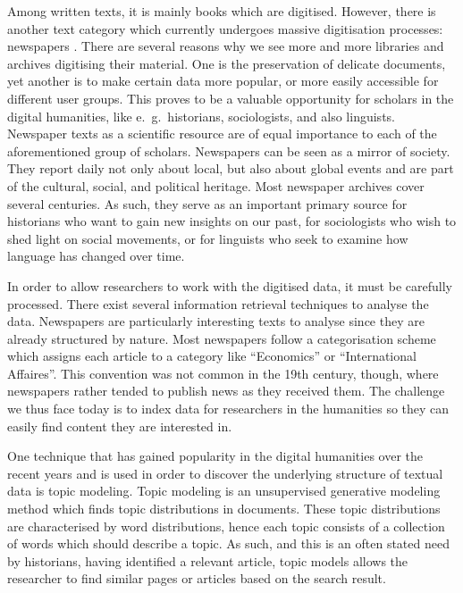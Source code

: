 Among written texts, it is mainly books which are digitised. However, there is another text category which currently undergoes massive digitisation processes: newspapers \citep{lansdall-welfarecontent2017,prestondigital2016,binghamdigitization2010}. There are several reasons why we see more and more libraries and archives digitising their material. One is the preservation of delicate documents, yet another is to make certain data more popular, or more easily accessible for different user groups. This proves to be a valuable opportunity for scholars in the digital humanities, like e.~g.~historians, sociologists, and also linguists. Newspaper texts as a scientific resource are of equal importance to each of the aforementioned group of scholars. Newspapers can be seen as a mirror of society. They report daily not only about local, but also about global events and are part of the cultural, social, and political heritage. Most newspaper archives cover several centuries. As such, they serve as an important primary source for historians who want to gain new insights on our past, for sociologists who wish to shed light on social movements, or for linguists who seek to examine how language has changed over time.

In order to allow researchers to work with the digitised data, it must be carefully processed. There exist several information retrieval techniques to analyse the data. Newspapers are particularly interesting texts to analyse since they are already structured by nature. Most newspapers follow a categorisation scheme which assigns each article to a category like ``Economics'' or ``International Affaires''. This convention was not common in the 19th century, though, where newspapers rather tended to publish news as they received them. The challenge we thus face today is to index data for researchers in the humanities so they can easily find content they are interested in. 

One technique that has gained popularity in the digital humanities over the recent years and is used in order to discover the underlying structure of textual data is topic modeling. Topic modeling is an unsupervised generative modeling method which finds topic distributions in documents. These topic distributions are characterised by word distributions, hence each topic consists of a collection of words which should describe a topic. As such, and this is an often stated need by historians, having identified a relevant article, topic models allows the researcher to find similar pages or articles based on the search result.

